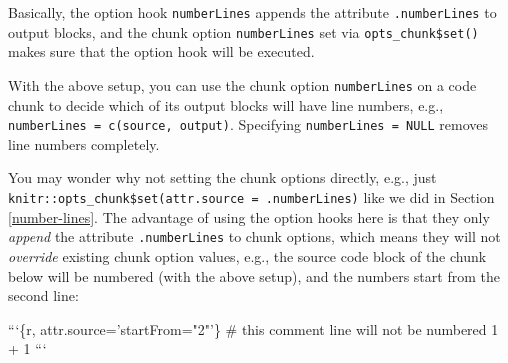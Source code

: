 \documentclass[
  11pt,
]{krantz}
\newenvironment{Shaded}{\begin{snugshade}}{\end{snugshade}}
\newcommand{\BaseNTok}[1]{\textcolor[rgb]{0.06,0.06,0.06}{#1}}
\newcommand{\ControlFlowTok}[1]{\textcolor[rgb]{0.27,0.27,0.27}{\textbf{#1}}}
\newcommand{\DataTypeTok}[1]{\textcolor[rgb]{0.27,0.27,0.27}{#1}}
\newcommand{\KeywordTok}[1]{\textcolor[rgb]{0.27,0.27,0.27}{\textbf{#1}}}
\newcommand{\NormalTok}[1]{#1}
\newcommand{\OperatorTok}[1]{\textcolor[rgb]{0.43,0.43,0.43}{\textbf{#1}}}
\newcommand{\StringTok}[1]{\textcolor[rgb]{0.5,0.5,0.5}{#1}}
\begin{document}
\begin{Shaded}
\end{Shaded}

Basically, the option hook \texttt{numberLines} appends the attribute \texttt{.numberLines} to output blocks, and the chunk option \texttt{numberLines} set via \texttt{opts\_chunk\$set()} makes sure that the option hook will be executed.

With the above setup, you can use the chunk option \texttt{numberLines} on a code chunk to decide which of its output blocks will have line numbers, e.g., \texttt{numberLines\ =\ c(\textquotesingle{}source\textquotesingle{},\ \textquotesingle{}output\textquotesingle{})}. Specifying \texttt{numberLines\ =\ NULL} removes line numbers completely.

You may wonder why not setting the chunk options directly, e.g., just \texttt{knitr::opts\_chunk\$set(attr.source\ =\ \textquotesingle{}.numberLines\textquotesingle{})} like we did in Section \ref{number-lines}. The advantage of using the option hooks here is that they only \emph{append} the attribute \texttt{.numberLines} to chunk options, which means they will not \emph{override} existing chunk option values, e.g., the source code block of the chunk below will be numbered (with the above setup), and the numbers start from the second line:

\begin{Shaded}
\begin{Highlighting}[]
\BaseNTok{```\{r, attr.source='startFrom="2"'\}}
\BaseNTok{# this comment line will not be numbered}
\BaseNTok{1 + 1}
\BaseNTok{```}
\end{Highlighting}
\end{Shaded}
\end{document}
